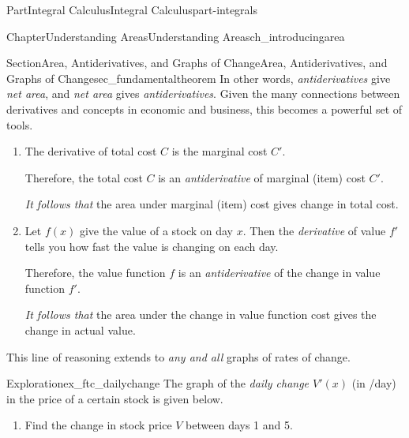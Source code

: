 \documentclass{tufte-book}
\numberwithin{equation}{chapter}
\begin{document}
\begin{partptx}{Part}{Integral Calculus}{}{Integral Calculus}{}{}{part-integrals}
\begin{chapterptx}{Chapter}{Understanding Areas}{}{Understanding Areas}{}{}{ch_introducingarea}
\begin{sectionptx}{Section}{Area, Antiderivatives, and Graphs of Change}{}{Area, Antiderivatives, and Graphs of Change}{}{}{sec_fundamentaltheorem}
In other words, \emph{antiderivatives} give \emph{net area}, and \emph{net area} gives \emph{antiderivatives}. Given the many connections between derivatives and concepts in economic and business, this becomes a powerful set of tools.%
\par
%
\begin{enumerate}
\item{}The derivative of total cost \(C\) is the marginal cost \(C'\).%
\par
Therefore, the total cost \(C\) is an \emph{antiderivative} of marginal (item) cost \(C'\).%
\par
\emph{It follows that} the area under marginal (item) cost gives change in total cost.%
\item{}Let \(f(x)\) give the value of a stock on day \(x\).  Then the \emph{derivative} of value \(f'\) tells you how fast the value is changing on each day.%
\par
Therefore, the value function \(f\) is an \emph{antiderivative} of the change in value function \(f'\).%
\par
\emph{It follows that} the area under the change in value function cost gives the change in actual value.%
\end{enumerate}
%
\par
This line of reasoning extends to \emph{any and all} graphs of rates of change.%
\begin{exploration}{Exploration}{}{ex_ftc_dailychange}%
The graph of the \emph{daily change \(V'(x)\)} (in \textdollar{}\slash{}day) in the price of a certain stock is given below.%
\begin{image}{0.125}{0.75}{0.125}{}%
%
\end{image}%
\begin{enumerate}[font=\bfseries,label=(\alph*),ref=\alph*]%
\item{}Find the change in stock price \(V\) between days 1 and 5.%

\end{enumerate}
\end{exploration}
\end{sectionptx}
\end{chapterptx}
\end{partptx}
\end{document}
